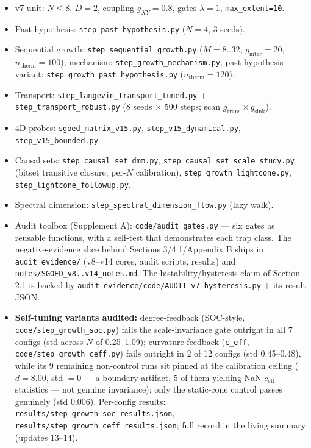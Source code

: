 \begin{itemize}
\tightlist
\item
  v7 unit: \(N\le8\), \(D=2\), coupling \(g_{XY}=0.8\), gates
  \(\lambda=1\), \texttt{max\_extent=10}.
\item
  Past hypothesis: \texttt{step\_past\_hypothesis.py} (\(N=4\), 3
  seeds).
\item
  Sequential growth: \texttt{step\_sequential\_growth.py} (\(M=8..32\),
  \(g_{\mathrm{inter}}=20\), \(n_{\mathrm{therm}}=100\)); mechanism:
  \texttt{step\_growth\_mechanism.py}; past-hypothesis variant:
  \texttt{step\_growth\_past\_hypothesis.py}
  (\(n_{\mathrm{therm}}=120\)).
\item
  Transport: \texttt{step\_langevin\_transport\_tuned.py} +
  \texttt{step\_transport\_robust.py} (8 seeds \(\times\) 500 steps;
  scan \(g_{\mathrm{trans}}\times g_{\mathrm{sink}}\)).
\item
  4D probes: \texttt{sgoed\_matrix\_v15.py},
  \texttt{step\_v15\_dynamical.py}, \texttt{step\_v15\_bounded.py}.
\item
  Causal sets: \texttt{step\_causal\_set\_dmm.py},
  \texttt{step\_causal\_set\_scale\_study.py} (bitset transitive
  closure; per-\(N\) calibration), \texttt{step\_growth\_lightcone.py},
  \texttt{step\_lightcone\_followup.py}.
\item
  Spectral dimension: \texttt{step\_spectral\_dimension\_flow.py} (lazy
  walk).
\item
  Audit toolbox (Supplement A): \texttt{code/audit\_gates.py} --- six
  gates as reusable functions, with a self-test that demonstrates each
  trap class. The negative-evidence slice behind Sections 3/4.1/Appendix
  B ships in \texttt{audit\_evidence/} (v8--v14 cores, audit scripts,
  results) and \texttt{notes/SGOED\_v8..v14\_notes.md}. The
  bistability/hysteresis claim of Section 2.1 is backed by
  \texttt{audit\_evidence/code/AUDIT\_v7\_hysteresis.py} + its result
  JSON.
\item
  \textbf{Self-tuning variants audited:} degree-feedback (SOC-style,
  \texttt{code/step\_growth\_soc.py}) fails the scale-invariance gate
  outright in all 7 configs (std across \(N\) of 0.25--1.09);
  curvature-feedback (\texttt{c\_eff},
  \texttt{code/step\_growth\_ceff.py}) fails outright in 2 of 12 configs
  (std 0.45--0.48), while its 9 remaining non-control runs sit pinned at
  the calibration ceiling (\(d=8.00\), std \(=0\) --- a boundary
  artifact, 5 of them yielding NaN \(c_{\mathrm{eff}}\) statistics ---
  not genuine invariance); only the static-cone control passes genuinely
  (std 0.006). Per-config results:
  \texttt{results/step\_growth\_soc\_results.json},
  \texttt{results/step\_growth\_ceff\_results.json}; full record in the
  living summary (updates 13--14).
\end{itemize}

